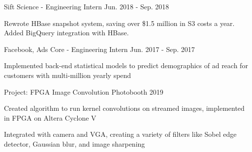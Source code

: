 
\begin{cventries}
  \vspace{-0.5em}
  \cventry
    {Sift Science - Engineering Intern}
    {}
    {}
    {Jun. 2018 - Sep. 2018}
    {
      \begin{cvitems}
        \item {Rewrote HBase snapshot system, saving over \$1.5 million in S3 costs a year. Added BigQuery integration with HBase.}
      \end{cvitems}
    }
  \vspace{-0.5em}
\end{cventries}

\begin{cventries}
  \vspace{-0.5em}
  \cventry
    {Facebook, Ads Core - Engineering Intern}
    {}
    {}
    {Jun. 2017 - Sep. 2017}
    {
      \begin{cvitems}
    \item {Implemented back-end statistical models to predict demographics of ad reach for customers with multi-million yearly spend}
      \end{cvitems}
    }
  \vspace{-0.5em}
\end{cventries}

\begin{cventries}
  \vspace{-0.5em}
  \cventry
    {Project: FPGA Image Convolution Photobooth}
    {}
    {}
    {2019}
    {
    \begin{cvitems}
	\item {Created algorithm to run kernel convolutions on streamed images, implemented in FPGA on Altera Cyclone V}
    \item {Integrated with camera and VGA, creating a variety of filters like Sobel edge detector, Gaussian blur, and image sharpening}
    \end{cvitems}
    }
  \vspace{-0.5em}
\end{cventries}